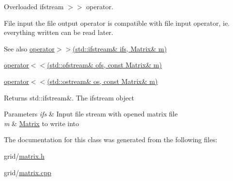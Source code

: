 Overloaded ifstream $>$$>$ operator. 

File input the file output operator is compatible with file input operator, ie. everything written can be read later. \begin{DoxySeeAlso}{See also}
\hyperlink{classMatrix_aa5699a0bdf0ee014f083ff8a76629d21}{operator$>$$>$(std\+::ifstream\& ifs, Matrix\& m)} 

\hyperlink{classMatrix_aa574249d63b390cf1108d6e82047ef61}{operator$<$$<$(std\+::ofstream\& ofs, const Matrix\& m)} 

\hyperlink{classMatrix_a060711074cb5bcaf4e75498bc040c4b7}{operator$<$$<$(std\+::ostream\& os, const Matrix\& m)} 
\end{DoxySeeAlso}
\begin{DoxyReturn}{Returns}
std\+::ifstream\&. The ifstream object 
\end{DoxyReturn}

\begin{DoxyParams}{Parameters}
{\em ifs} & Input file stream with opened matrix file \\
\hline
{\em m} & \hyperlink{classMatrix}{Matrix} to write into \\
\hline
\end{DoxyParams}


The documentation for this class was generated from the following files\+:\begin{DoxyCompactItemize}
\item 
grid/\hyperlink{matrix_8h}{matrix.\+h}\item 
grid/\hyperlink{matrix_8cpp}{matrix.\+cpp}\end{DoxyCompactItemize}
